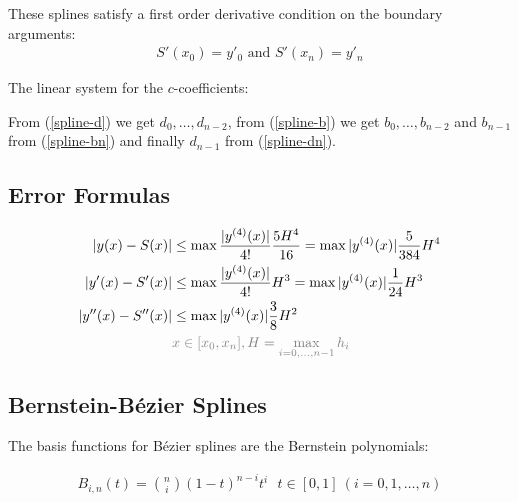 These splines satisfy a first order derivative condition on the boundary arguments:
\begin{align*}
    S'(x_0)=y'_0\text{ and }S'(x_n)=y'_n
\end{align*}

The linear system for the $c$-coefficients:

From (\ref{spline-d}) we get $d_0,\ldots,d_{n-2}$,
from (\ref{spline-b}) we get $b_0,\ldots,b_{n-2}$ and $b_{n-1}$ from (\ref{spline-bn})
and finally $d_{n-1}$ from (\ref{spline-dn}).

\subsection{Error Formulas}
\begin{align*}
    |y(x)-S(x)| & \leq\max\frac{|y^{(4)}(x)|}{4!}\frac{5H^4}{16} = \max |y^{(4)}(x)|\frac{5}{384}H^4 \\
    |y'(x)-S'(x)| & \leq\max\frac{|y^{(4)}(x)|}{4!}H^3 = \max |y^{(4)}(x)|\frac{1}{24}H^3 \\
    |y''(x)-S''(x)| & \leq\max|y^{(4)}(x)|\frac{3}{8}H^2 \\
    & {\color{gray} x\in [x_0,x_n], H = \max_{i=0,\ldots,n-1}h_i}
\end{align*}

\subsection{Bernstein-B\'ezier Splines}

The basis functions for B\'ezier splines are the Bernstein polynomials:
\begin{snugshade*}
	\begin{align*}
		B_{i,n}(t) = \binom{n}{i}(1-t)^{n-i}t^i\ \ \ t\in[0,1]\ (i=0,1,\ldots,n)
	\end{align*}
\end{snugshade*}

